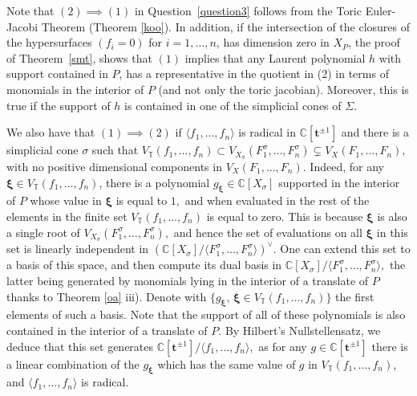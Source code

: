 \documentclass[a4paper,11pt]{amsart}
\newcommand{\C}{\mathbb{C}}
\newcommand{\T}{\mathbb{T}}
\newcommand{\bft}{{\boldsymbol{t}}}
\newcommand{\bfxi}{{\boldsymbol{\xi}}}
\numberwithin{thm}{section}
\numberwithin{equation}{section}
\theoremstyle{definition}
\theoremstyle{plain}
\begin{document}
Note that $(2)\implies (1)$ in Question~\ref{question3} follows from the Toric Euler-Jacobi Theorem (Theorem \ref{koo}). 
In addition, if  the intersection of the closures of the hypersurfaces $(f_i=0)$ for $i=1,\dots,n$, has dimension zero in $X_P$,  the proof of Theorem~\ref{smt}, shows that $(1)$ implies that any Laurent polynomial $h$ with support contained in $P$, has a representative in the quotient in (2) in terms of monomials in the interior of $P$ (and not only the toric jacobian). Moreover, this is true if the support of $h$ is contained in one of the simplicial cones of $\Sigma$.

We also have that $(1)\implies (2)$ if $\langle f_1,\ldots, f_n\rangle$ is radical in $\C[\bft^{\pm1}]$  and there is a simplicial cone $\sigma$ such that $V_{\T}(f_1,\ldots, f_n)\subset V_{X_\sigma}(F^\sigma_1,\ldots, F^\sigma_n)\subsetneq V_{X}(F_1,\ldots, F_n),$ with no positive dimensional components in $V_{X}(F_1,\ldots, F_n).$ Indeed, for any $\bfxi\in V_{\T}(f_1,\ldots, f_n)$, there is a polynomial $g_\bfxi\in\C[X_\sigma]$ supported in the interior of $P$ whose value in $\bfxi$ is equal to $1,$ and when evaluated in the rest of the elements in the finite set $V_{\T}(f_1,\ldots, f_n)$ is equal to zero. 
 This is because  $\bfxi$ is also a single root of $V_{X_\sigma}(F^\sigma_1,\ldots, F^\sigma_n),$ and hence the set of evaluations on all $\bfxi$ in this set is linearly independent in $\left(\C[X_\sigma]/\langle F^\sigma_1,\ldots, F^\sigma_n\rangle\right)^\vee.$ One can extend this set to a basis of this space, and then compute its dual basis in $\C[X_\sigma]/\langle F^\sigma_1,\ldots, F^\sigma_n\rangle,$ the latter being generated by monomials lying in the interior of a translate of $P$ thanks to Theorem \ref{oa} iii). Denote with $\{g_\bfxi,\,\bfxi\in V_\T(f_1,\ldots, f_n)\}$ the first elements of such a basis. Note that the support of all of these polynomials is also contained in the interior of a translate of $P$.  By Hilbert's Nullstellensatz, we deduce that this set generates  $\C[\bft^{\pm1}]/\langle  f_1,\ldots, f_n\rangle,$ as for any $g\in\C[\bft^{\pm1}]$ there is a linear combination of the $g_\bfxi$ which has the same value of $g$ in  $V_{\T}(f_1,\ldots, f_n),$ and $\langle f_1,\ldots, f_n\rangle$ is radical.
\end{document}
